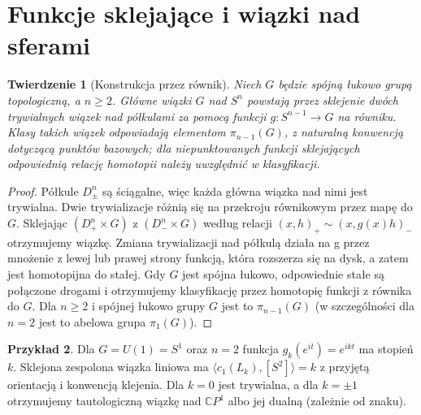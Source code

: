 \documentclass[11pt,a4paper,oneside]{report}
\newcommand{\C}{\mathbb{C}}
\theoremstyle{plain}
\newtheorem{twierdzenie}{Twierdzenie}[section]
\theoremstyle{definition}
\newtheorem{przyklad}[twierdzenie]{Przykład}
\theoremstyle{remark}
\begin{document}
\section{Funkcje sklejające i wiązki nad sferami}
\begin{twierdzenie}[Konstrukcja przez równik]
Niech $G$ będzie spójną łukowo grupą topologiczną,
a $n\ge2$. Główne wiązki $G$ nad $S^n$ powstają
przez sklejenie dwóch trywialnych wiązek nad
półkulami za pomocą funkcji
$g:S^{n-1}\to G$ na równiku. Klasy takich wiązek
odpowiadają elementom $\pi_{n-1}(G)$, z naturalną
konwencją dotyczącą punktów bazowych; dla niepunktowanych
funkcji sklejających odpowiednią relację homotopii
należy uwzględnić w klasyfikacji.
\end{twierdzenie}
\begin{proof}
Półkule $D^n_\pm$ są ściągalne, więc każda główna wiązka
nad nimi jest trywialna. Dwie trywializacje różnią się
na przekroju równikowym przez mapę do $G$.
Sklejając $(D^n_+\times G)$ z $(D^n_-\times G)$
według relacji $(x,h)_+\sim(x,g(x)h)_-$ otrzymujemy
wiązkę. Zmiana trywializacji nad półkulą działa na
g przez mnożenie z lewej lub prawej strony funkcją,
która rozszerza się na dysk, a zatem jest homotopijna
do stałej. Gdy $G$ jest spójna łukowo, odpowiednie
stałe są połączone drogami i otrzymujemy klasyfikację
przez homotopię funkcji z równika do $G$.
Dla $n\ge2$ i spójnej łukowo grupy $G$ jest to
$\pi_{n-1}(G)$ (w szczególności dla $n=2$ jest to
abelowa grupa $\pi_1(G)$).
\end{proof}
\begin{przyklad}
Dla $G=U(1)=S^1$ oraz $n=2$ funkcja
$g_k(e^{it})=e^{ikt}$ ma stopień $k$.
Sklejona zespolona wiązka liniowa ma
$\langle c_1(L_k),[S^2]\rangle=k$ z przyjętą
orientacją i konwencją klejenia. Dla $k=0$ jest trywialna,
a dla $k=\pm1$ otrzymujemy tautologiczną wiązkę
nad $\C P^1$ albo jej dualną (zależnie od znaku).
\end{przyklad}
\end{document}
